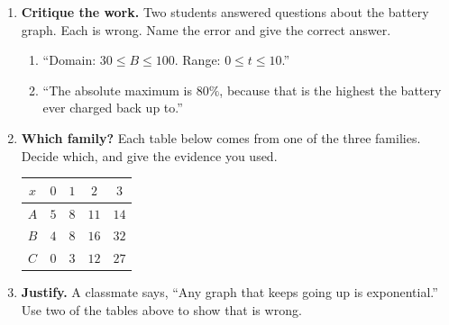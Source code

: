 \documentclass[10pt]{article}
\begin{document}
\vspace{0.10in}

\boxguard[30]
\begin{tcolorbox}[colback=white, colframe=black!40, title=\textbf{Tier E --- Extension},
    fonttitle=\bfseries, arc=2mm, left=3mm, right=3mm, top=2mm, bottom=2mm, breakable]
\small

\begin{enumerate}[leftmargin=1.6em, itemsep=4pt, topsep=2pt]
  \item \textbf{Critique the work.} Two students answered questions about the battery graph.
        Each is wrong. Name the error and give the correct answer.
        \begin{enumerate}[label=(\alph*), leftmargin=1.6em, itemsep=3pt, topsep=3pt]
          \item ``Domain: $30 \le B \le 100$. \quad Range: $0 \le t \le 10$.''


          \item ``The absolute maximum is $80\%$, because that is the highest the battery ever
                charged back up to.''

        \end{enumerate}

  \item \textbf{Which family?} Each table below comes from one of the three families. Decide
        which, and give the evidence you used.
        \smallskip

        \renewcommand{\arraystretch}{1.25}
        \begin{tabular}{@{}|c|c|c|c|c|@{}}
        \hline
        $x$ & $0$ & $1$ & $2$ & $3$ \\ \hline
        $A$ & $5$ & $8$ & $11$ & $14$ \\ \hline
        $B$ & $4$ & $8$ & $16$ & $32$ \\ \hline
        $C$ & $0$ & $3$ & $12$ & $27$ \\ \hline
        \end{tabular}
        \smallskip


  \item \textbf{Justify.} A classmate says, ``Any graph that keeps going up is exponential.'' Use
        two of the tables above to show that is wrong.

\end{enumerate}
\end{tcolorbox}
\end{document}
